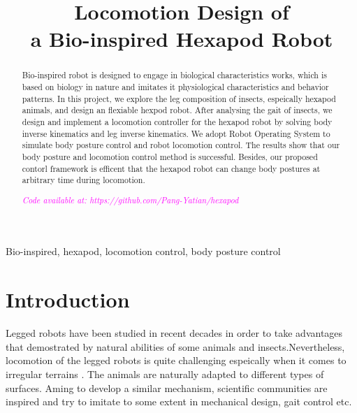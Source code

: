 \documentclass[conference]{IEEEtran}
\begin{document}
\title{Locomotion Design of \\a Bio-inspired Hexapod Robot\\}
\author{
}

\maketitle

\begin{abstract}
Bio-inspired robot is designed to engage in biological characteristics works, which is based on biology in nature and imitates it physiological characteristics and behavior
patterns. In this project, we explore the leg composition of insects, espeically hexapod animals, and design an flexiable hexpod robot. After analysing the gait of insects, we  design and implement a locomotion controller for the hexapod robot by solving body inverse kinematics and leg inverse kinematics. We adopt Robot Operating System to simulate body posture control and robot locomotion control. The results show that our body posture and locomotion control method is successful. Besides, our proposed contorl framework is efficent that the hexapod robot can change body postures at arbitrary time during locomotion. 

\textit{\textcolor{magenta}{Code available at: https://github.com/Pang-Yatian/hexapod}}
\end{abstract}

\begin{IEEEkeywords}
Bio-inspired, hexapod, locomotion control, body posture control
\end{IEEEkeywords}

\section{Introduction}
Legged robots have been studied in recent decades in order to take advantages that demostrated by natural abilities of some animals and insects.Nevertheless, locomotion of the legged robots is quite challenging espeically when it comes to irregular terrains \cite{a2}\cite{a3}. The animals are naturally adapted to different types of surfaces. Aming to develop a similar mechanism, scientific communities are inspired and try to imitate to some extent in mechanical design, gait control etc.
\end{document}
